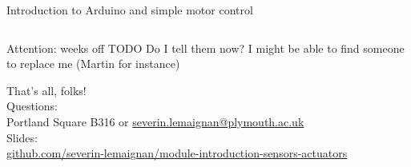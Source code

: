 \documentclass[compress]{beamer}
\begin{document}
\begin{frame}{Introduction to Arduino and simple motor control}
\begin{columns}
\begin{column}{0.45\linewidth}
        \end{column}
    \end{columns}
\end{frame}


\begin{frame}{Attention: weeks off}
    TODO Do I tell them now? I might be able to find someone to replace me
    (Martin for instance)
\end{frame}


\begin{frame}{}
    \begin{center}
        \Large
        That's all, folks!\\[2em]
        \normalsize
        Questions:\\
        Portland Square B316 or \url{severin.lemaignan@plymouth.ac.uk} \\[1em]

        Slides:\\
        \href{https://github.com/severin-lemaignan/module-mobile-and-humanoid-robots}{\small
        github.com/severin-lemaignan/module-introduction-sensors-actuators}

    \end{center}
\end{frame}
\end{document}
